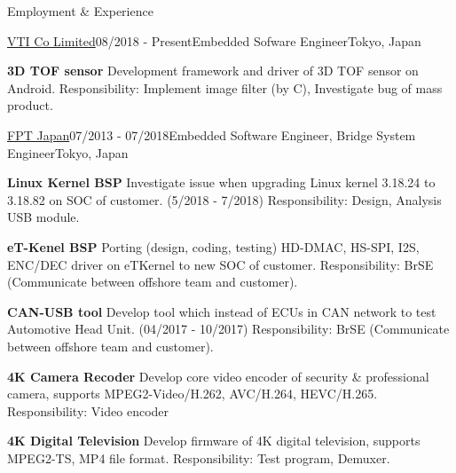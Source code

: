 \documentclass{resume}
\begin{document}
  \begin{rSection}{Employment \& Experience}
  
    \begin{rSubsection}{\underline{VTI Co Limited}}{08/2018 - Present}{Embedded Sofware Engineer}{Tokyo, Japan}
    \item \textbf{3D TOF sensor} Development framework and driver of 3D TOF sensor on Android. 
    \newline Responsibility: Implement image filter (by C), Investigate bug of mass product.
    \end{rSubsection}
  
    \begin{rSubsection}{\underline{FPT Japan}}{07/2013 - 07/2018}{Embedded Software Engineer, Bridge System Engineer}{Tokyo, Japan}
    \item \textbf{Linux Kernel BSP} Investigate issue when upgrading Linux kernel 3.18.24 to 3.18.82 on SOC of customer. (5/2018 - 7/2018)
    \newline Responsibility: Design, Analysis USB module.

    \item \textbf{eT-Kenel BSP} Porting (design, coding, testing) HD-DMAC, HS-SPI, I2S, ENC/DEC driver on eTKernel to new SOC of customer.
    \newline Responsibility: BrSE (Communicate between offshore team and customer).

    \item \textbf{CAN-USB tool} Develop tool which instead of ECUs in CAN network to test Automotive Head Unit. (04/2017 - 10/2017) 
    \newline Responsibility: BrSE (Communicate between offshore team and customer).

    \item \textbf{4K Camera Recoder} Develop core video encoder of security \& professional camera, supports MPEG2-Video/H.262, AVC/H.264, HEVC/H.265.
    \newline Responsibility: Video encoder

    \item \textbf{4K Digital Television} Develop firmware of 4K digital television, supports MPEG2-TS, MP4 file format.
    \newline Responsibility: Test program, Demuxer.

    \end{rSubsection}


\end{rSection}
\end{document}
